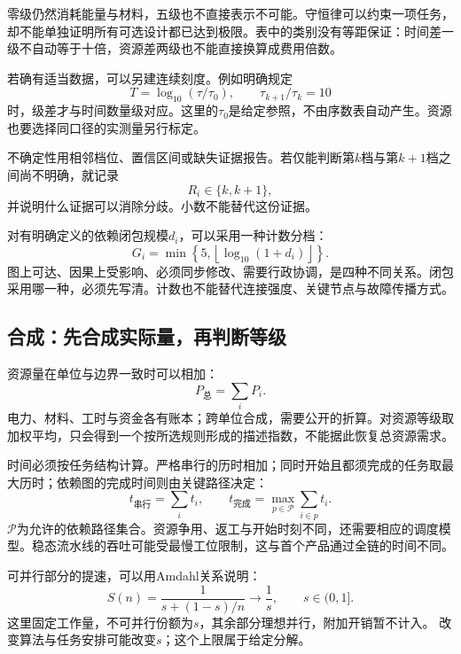 零级仍然消耗能量与材料，五级也不直接表示不可能。守恒律可以约束一项任务，却不能单独证明所有可选设计都已达到极限。表中的类别没有等距保证：时间差一级不自动等于十倍，资源差两级也不能直接换算成费用倍数。

若确有适当数据，可以另建连续刻度。例如明确规定
\begin{equation}
T=\log_{10}(\tau/\tau_0),
\qquad
\tau_{k+1}/\tau_k=10
\label{eq:scale-decade}
\end{equation}
时，级差才与时间数量级对应。这里的$\tau_0$是给定参照，不由序数表自动产生。资源也要选择同口径的实测量另行标定。

不确定性用相邻档位、置信区间或缺失证据报告。若仅能判断第$k$档与第$k+1$档之间尚不明确，就记录
\begin{equation}
R_i\in\{k,k+1\},
\label{eq:scale-fuzzy}
\end{equation}
并说明什么证据可以消除分歧。小数不能替代这份证据。

对有明确定义的依赖闭包规模$d_i$，可以采用一种计数分档：
\begin{equation}
G_i=\min\!\left\{5,\left\lfloor\log_{10}(1+d_i)\right\rfloor\right\}.
\label{eq:scale-G-def}
\end{equation}
图上可达、因果上受影响、必须同步修改、需要行政协调，是四种不同关系。闭包采用哪一种，必须先写清。计数也不能替代连接强度、关键节点与故障传播方式。

\subsection{合成：先合成实际量，再判断等级}

资源量在单位与边界一致时可以相加：
\begin{equation}
P_{\text{总}}=\sum_i P_i .
\label{eq:scale-R-agg}
\end{equation}
电力、材料、工时与资金各有账本；跨单位合成，需要公开的折算。对资源等级取加权平均，只会得到一个按所选规则形成的描述指数，不能据此恢复总资源需求。

时间必须按任务结构计算。严格串行的历时相加；同时开始且都须完成的任务取最大历时；依赖图的完成时间则由关键路径决定：
\begin{equation}
t_{\text{串行}}=\sum_i t_i,
\qquad
t_{\text{完成}}=\max_{p\in\mathcal P}\sum_{i\in p}t_i .
\label{eq:scale-T-agg}
\end{equation}
$\mathcal P$为允许的依赖路径集合。资源争用、返工与开始时刻不同，还需要相应的调度模型。稳态流水线的吞吐可能受最慢工位限制，这与首个产品通过全链的时间不同。

可并行部分的提速，可以用Amdahl关系说明：
\begin{equation}
S(n)=\frac{1}{s+(1-s)/n}\longrightarrow\frac1s,\qquad s\in(0,1].
\label{eq:scale-amdahl}
\end{equation}
这里固定工作量，不可并行份额为$s$，其余部分理想并行，附加开销暂不计入。\cite{amdahl1967validity} 改变算法与任务安排可能改变$s$；这个上限属于给定分解。

